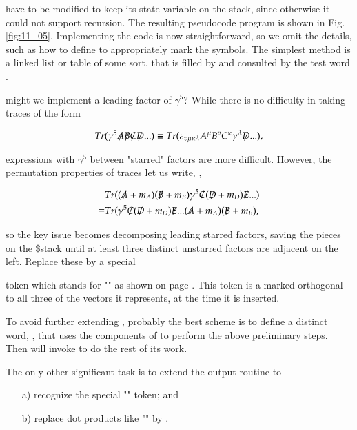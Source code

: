 have to be modified to keep its state variable on the stack, since otherwise it could not support recursion. The resulting pseudocode program is shown in Fig. \ref{fig:11_05}. Implementing the code is now straightforward, so we omit the details, such as how to define  to appropriately mark the symbols. The simplest method is a linked list or table of some sort, that is filled by  and consulted by the test word .

 might we implement a leading factor of $\gamma^{5}$? While there is no difficulty in taking traces of the form

\begin{equation}
Tr( \gamma^{5} \tr{A} \tr{B} \tr{C} \tr{D} ...) \equiv Tr(\varepsilon_{v\mu\kappa\lambda} A^{\mu} B^{v} C^{\kappa} \gamma^{\lambda} \tr{D} ...),
\end{equation}

expressions with $\gamma^{5}$ between "starred" factors are more difficult. However, the permutation properties of traces let us write, \eg,

\begin{align}
& Tr( (\tr{A} + m_{A})(\tr{B} + m_{B})\gamma^{5} \tr{C}(\tr{D} + m_{D})\tr{E} ... ) \\
\equiv & Tr(\gamma^{5}\tr{C}(\tr{D} + m_{D})\tr{E} ... (\tr{A} + m_{A})(\tr{B} + m_{B}) ,
\end{align}

so the key issue becomes decomposing leading starred factors, saving the pieces on the \$stack until at least three distinct unstarred factors are adjacent on the left. Replace these by a special 

token which stands for "\bc{^}" as shown on page \pageref{page:11_276}. This token is a marked orthogonal to all three of the vectors it represents, at the time it is inserted.

To avoid further extending , probably the best scheme is to define a distinct word, , that uses the components of  to perform the above preliminary steps. Then  will invoke  to do the rest of its work.

The only other significant task is to extend the output routine to

\begin{enumerate}
\item[a)] recognize the special "\bc{^}" token; and
\item[b)] replace dot products like "" by \bc{[a,b,c,d]}.
\end{enumerate}


